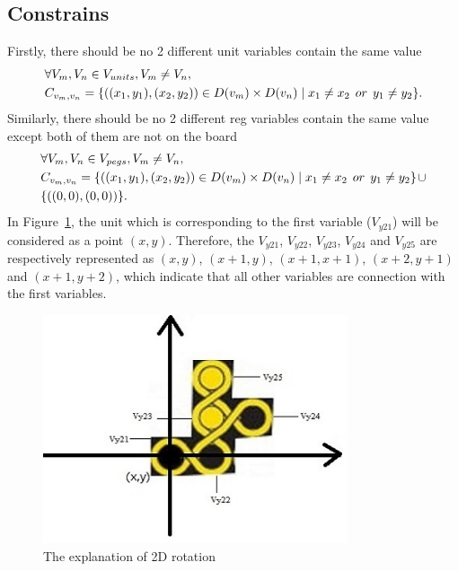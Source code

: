 \subsection{Constrains}
Firstly, there should be no 2 different unit variables contain the same value
\begin{equation}
\begin{aligned}
&\forall V_{m},V_{n} \in V_{units},V_{m} \neq V_{n},\\
&C_{v_{m},v_{n}}=\{((x_{1},y_{1}),(x_{2},y_{2}))\in D(v_{m}) \times D(v_{n})\mid x_{1} \neq x_{2}   \hspace{1ex} or \hspace{1ex}  y_{1} \neq y_{2}\}.
\end{aligned}
\end{equation}
Similarly, there should be no 2 different reg variables contain the same value except both of them are not on the board
\begin{equation}
\begin{aligned}
&\forall V_{m},V_{n}\in V_{pegs}, V_{m} \neq V_{n},\\
&C_{v_{m},v_{n}}=\{((x_{1},y_{1}),(x_{2},y_{2}))\in D(v_{m})\times D(v_{n})\mid x_{1} \neq x_{2}   \hspace{1ex} or \hspace{1ex}  y_{1} \neq y_{2}\}\hspace{1pt}\cup \\
&\{((0,0),(0,0))\}.
\end{aligned}
\end{equation}
In Figure~\ref{fig:explanation2D}, the unit which is corresponding to the first variable ($V_{y21}$) will be considered as a point $(x,y)$. Therefore, the $V_{y21}$, $V_{y22}$, $V_{y23}$, $V_{y24}$ and $V_{y25}$ are respectively represented as $(x,y)$, $(x+1,y)$, $(x+1,x+1)$, $(x+2,y+1)$ and $(x+1,y+2)$, which indicate that all other variables are connection with the first variables.
\begin{figure}[htbp]
\centering
\includegraphics[width=0.8\textwidth]{figs/explanation2D.jpg}
\caption{The explanation of 2D rotation}
    \label{fig:explanation2D}
\end{figure}
